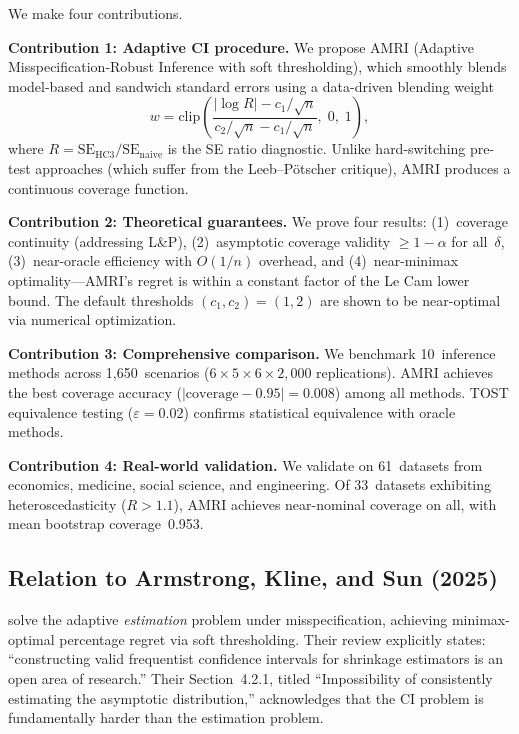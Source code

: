 \documentclass[12pt]{article}
\theoremstyle{definition}
\theoremstyle{remark}
\newcommand{\se}{\mathrm{SE}}
\begin{document}
We make four contributions.

\textbf{Contribution 1: Adaptive CI procedure.} We propose AMRI (Adaptive Misspecification-Robust Inference with soft thresholding), which smoothly blends model-based and sandwich standard errors using a data-driven blending weight
\begin{equation}\label{eq:blending_weight}
w = \mathrm{clip}\!\left(\frac{|\log R| - c_1/\sqrt{n}}{c_2/\sqrt{n} - c_1/\sqrt{n}},\; 0,\; 1\right),
\end{equation}
where $R = \se_{\mathrm{HC3}}/\se_{\mathrm{naive}}$ is the SE ratio diagnostic. Unlike hard-switching pre-test approaches (which suffer from the Leeb--P\"otscher critique), AMRI produces a continuous coverage function.

\textbf{Contribution 2: Theoretical guarantees.} We prove four results: (1)~coverage continuity (addressing L\&P), (2)~asymptotic coverage validity $\geq 1-\alpha$ for all~$\delta$, (3)~near-oracle efficiency with $O(1/n)$ overhead, and (4)~near-minimax optimality---AMRI's regret is within a constant factor of the Le Cam lower bound. The default thresholds $(c_1, c_2) = (1, 2)$ are shown to be near-optimal via numerical optimization.

\textbf{Contribution 3: Comprehensive comparison.} We benchmark 10~inference methods across 1,650~scenarios ($6 \times 5 \times 6 \times 2{,}000$ replications). AMRI achieves the best coverage accuracy ($|\text{coverage} - 0.95| = 0.008$) among all methods. TOST equivalence testing ($\varepsilon = 0.02$) confirms statistical equivalence with oracle methods.

\textbf{Contribution 4: Real-world validation.} We validate on 61~datasets from economics, medicine, social science, and engineering. Of 33~datasets exhibiting heteroscedasticity ($R > 1.1$), AMRI achieves near-nominal coverage on all, with mean bootstrap coverage~0.953.

\subsection{Relation to Armstrong, Kline, and Sun (2025)}

\citet{armstrong2025adapting} solve the adaptive \emph{estimation} problem under misspecification, achieving minimax-optimal percentage regret via soft thresholding. Their review explicitly states: ``constructing valid frequentist confidence intervals for shrinkage estimators is an open area of research.'' Their Section~4.2.1, titled ``Impossibility of consistently estimating the asymptotic distribution,'' acknowledges that the CI problem is fundamentally harder than the estimation problem.
\end{document}
